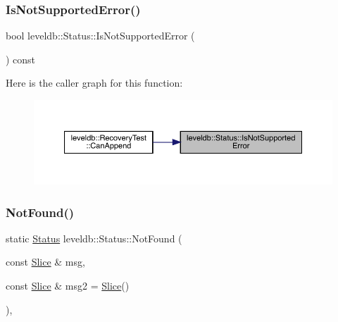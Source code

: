 \subsubsection{\texorpdfstring{IsNotSupportedError()}{IsNotSupportedError()}}
{\footnotesize\ttfamily bool leveldb\+::\+Status\+::\+Is\+Not\+Supported\+Error (\begin{DoxyParamCaption}{ }\end{DoxyParamCaption}) const\hspace{0.3cm}{\ttfamily [inline]}}

Here is the caller graph for this function\+:
\nopagebreak
\begin{figure}[H]
\begin{center}
\leavevmode
\includegraphics[width=350pt]{classleveldb_1_1_status_a2cca03c2723fc37c43df2b9e095f56bc_icgraph}
\end{center}
\end{figure}
\mbox{\label{classleveldb_1_1_status_a9e5beb5b2e758f041e0c012426e7b1b8}} 
\subsubsection{\texorpdfstring{NotFound()}{NotFound()}}
{\footnotesize\ttfamily static \mbox{\hyperlink{classleveldb_1_1_status}{Status}} leveldb\+::\+Status\+::\+Not\+Found (\begin{DoxyParamCaption}\item[{const \mbox{\hyperlink{classleveldb_1_1_slice}{Slice}} \&}]{msg,  }\item[{const \mbox{\hyperlink{classleveldb_1_1_slice}{Slice}} \&}]{msg2 = {\ttfamily \mbox{\hyperlink{classleveldb_1_1_slice}{Slice}}()} }\end{DoxyParamCaption})\hspace{0.3cm}{\ttfamily [inline]}, {\ttfamily [static]}}

